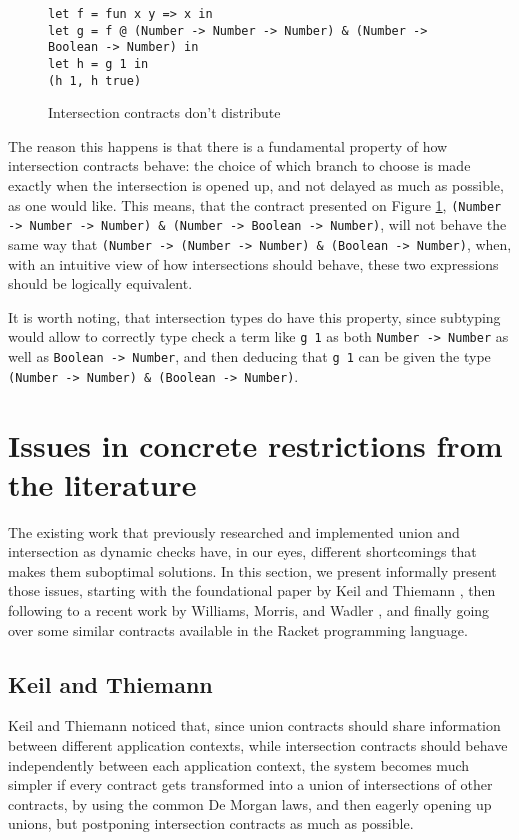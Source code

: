 \documentclass[sigplan,10pt,review,anonymous]{acmart}
\newcommand{\unsure}[2][1=]{}
\newcommand{\info}[2][1=]{}
\newcommand{\nickel}[1]{\lstinline[language=nickel]{#1}}
\begin{document}
\begin{figure}[h]
\begin{lstlisting}[language=nickel]
let f = fun x y => x in
let g = f @ (Number -> Number -> Number) & (Number -> Boolean -> Number) in
let h = g 1 in
(h 1, h true)
\end{lstlisting}
\caption{Intersection contracts don't distribute}
\label{fig:intersection-distrbution}
\end{figure}

The reason this happens is that
there is a fundamental property of how intersection
contracts behave: the choice of which branch to choose is made exactly
when the intersection is opened up, and not delayed as much as possible,
as one would like.
This means, that the contract presented on Figure \ref{fig:intersection-distrbution},
\nickel{(Number -> Number -> Number) & (Number -> Boolean -> Number)},
will not behave the same way that
\nickel{(Number -> (Number -> Number) & (Boolean -> Number)},
when, with an intuitive view of how intersections should behave,
these two expressions should be logically equivalent.

It is worth noting, that intersection types do have this property,
since subtyping would allow to correctly type check a term like
\nickel{g 1} as both \nickel{Number -> Number} as well as
\nickel{Boolean -> Number}, and then deducing that \nickel{g 1}
can be given the type \nickel{(Number -> Number) & (Boolean -> Number)}.


\newpage

\section{Issues in concrete restrictions from the literature}
\info{The various papers and the tradeoffs they make}

The existing work that previously researched and implemented
union and intersection
as dynamic checks have, in our eyes, different shortcomings
that makes them suboptimal solutions.
In this section, we present informally present those issues,
starting with the foundational paper by Keil and Thiemann
\cite{KeilThiemannUnionIntersection}, then following to a recent
work by Williams, Morris, and Wadler \cite{RootCauseOfBlame}, and
finally going over some similar contracts available in the Racket
programming language.

\subsection*{Keil and Thiemann}
\label{sec:keil-thiemann}
\unsure{Subsection title?}
Keil and Thiemann noticed that, since union contracts should share information between
different application contexts, while intersection contracts should behave
independently between each application context, the system becomes much
simpler if every contract gets transformed into a union of intersections
of other contracts, by using the common De Morgan laws,
and then eagerly opening up unions, but postponing intersection
contracts as much as possible.
\end{document}
